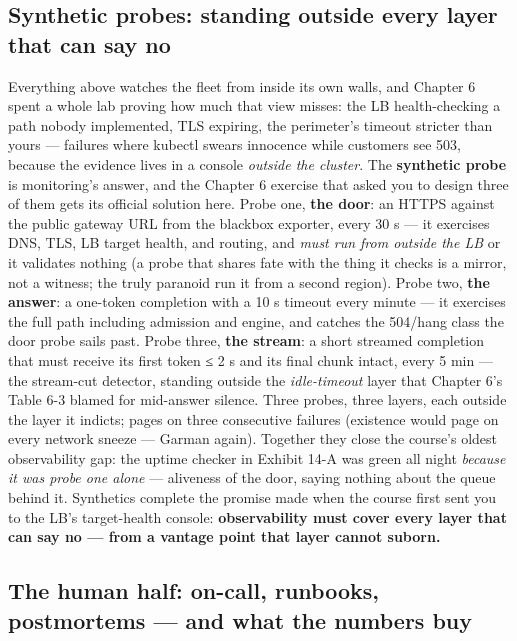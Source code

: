 \subsection*{Synthetic probes: standing outside every layer that can say no}

Everything above watches the fleet from inside its own walls, and Chapter 6 spent a whole lab proving how much that view misses: the LB health-checking a path nobody implemented, TLS expiring, the perimeter’s timeout stricter than yours — failures where kubectl swears innocence while customers see 503, because the evidence lives in a console \textit{outside the cluster}. The \textbf{synthetic probe} is monitoring’s answer, and the Chapter 6 exercise that asked you to design three of them gets its official solution here. Probe one, \textbf{the door}: an HTTPS  against the public gateway URL from the blackbox exporter, every 30 s — it exercises DNS, TLS, LB target health, and routing, and \textit{must run from outside the LB} or it validates nothing (a probe that shares fate with the thing it checks is a mirror, not a witness; the truly paranoid run it from a second region). Probe two, \textbf{the answer}: a one-token completion with a 10 s timeout every minute — it exercises the full path including admission and engine, and catches the 504/hang class the door probe sails past. Probe three, \textbf{the stream}: a short streamed completion that must receive its first token ≤ 2 s and its final chunk intact, every 5 min — the stream-cut detector, standing outside the \textit{idle-timeout} layer that Chapter 6’s Table 6-3 blamed for mid-answer silence. Three probes, three layers, each outside the layer it indicts;  pages on three consecutive failures (existence would page on every network sneeze — Garman again). Together they close the course’s oldest observability gap: the uptime checker in Exhibit 14-A was green all night \textit{because it was probe one alone} — aliveness of the door, saying nothing about the queue behind it. Synthetics complete the promise made when the course first sent you to the LB’s target-health console: \textbf{observability must cover every layer that can say no — from a vantage point that layer cannot suborn.}

\subsection*{The human half: on-call, runbooks, postmortems — and what the numbers buy}


